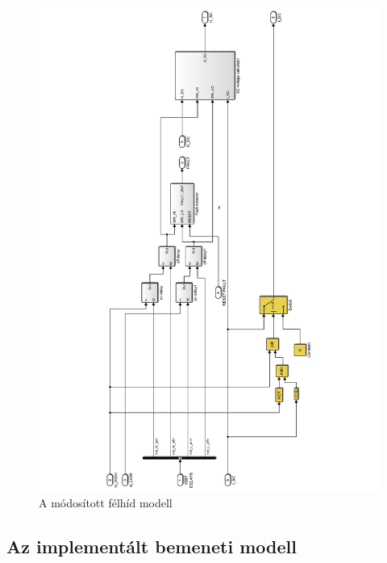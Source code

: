 \begin{figure}[]
	\centering
	\includegraphics[width = \textwidth]{figures/igbt_model.pdf}
	\caption{A módosított félhíd modell} 
	\label{fig:igbt_model}
\end{figure}




\subsection{Az implementált bemeneti modell}

